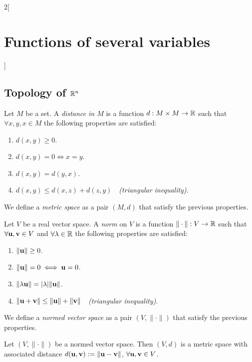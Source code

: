 \documentclass[../../../main.tex]{subfiles}
\begin{document}
\begin{multicols}{2}[\section{Functions of several variables}]
  \subsection{Topology of \texorpdfstring{$\mathbb{R}^n$}{Rn}}
  \begin{definition}
    Let $M$ be a set. A \textit{distance in $M$} is a function $d:M\times M\rightarrow\mathbb{R} $ such that $\forall x,y,x\in M$ the following properties are satisfied:
    \begin{enumerate}
      \item $d(x,y)\geq 0$.
      \item $d(x,y)=0\iff x=y$.
      \item $d(x,y)=d(y,x)$.
      \item $d(x,y)\leq d(x,z)+d(z,y)\quad$\textit{(triangular inequality)}.
    \end{enumerate}
    We define a \textit{metric space} as a pair $(M,d)$ that satisfy the previous properties.
    \label{FOSV_metric}
  \end{definition}
  \begin{definition}\label{FOSV_norm}
    Let $V$ be a real vector space. A \textit{norm} on $V$ is a function $\|\cdot\|:V\rightarrow\mathbb{R} $ such that $\forall \vb{u},\vb{v}\in V$ and $\forall\lambda\in\mathbb{R} $ the following properties are satisfied:
    \begin{enumerate}
      \item $\|\vb{u}\|\geq 0$.
      \item $\|\vb{u}\|=0\iff \vb{u}=0$.
      \item $\|\lambda \vb{u}\|=|\lambda|\|\vb{u}\|$.
      \item $\|\vb{u}+\vb{v}\|\leq \|\vb{u}\|+\|\vb{v}\|\quad$\textit{(triangular inequality)}.
    \end{enumerate}
    We define a \textit{normed vector space} as a pair $(V,\|\cdot\|)$ that satisfy the previous properties.
  \end{definition}
  \begin{prop}
    Let $(V,\|\cdot\|)$ be a normed vector space. Then $(V,d)$ is a metric space with associated distance $d(\vb{u},\vb{v}):=\|\vb{u}-\vb{v}\|$, $\forall \vb{u},\vb{v}\in V$.

\end{prop}
\end{multicols}
\end{document}
